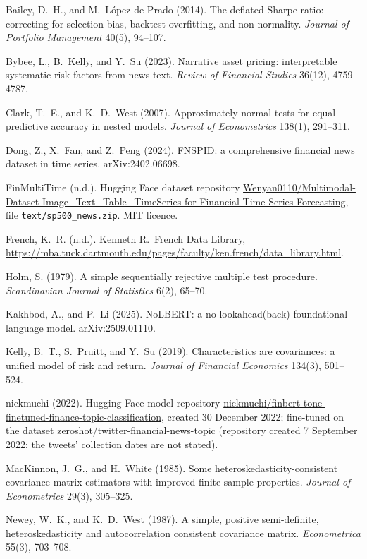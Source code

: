 \documentclass[11pt]{article}
\begin{document}
\begin{description}\setlength{\itemsep}{0pt}
\item Bailey, D.~H., and M.~L\'opez de Prado (2014). The deflated Sharpe ratio: correcting for selection bias, backtest overfitting, and non-normality. \emph{Journal of Portfolio Management} 40(5), 94--107.
\item Bybee, L., B.~Kelly, and Y.~Su (2023). Narrative asset pricing: interpretable systematic risk factors from news text. \emph{Review of Financial Studies} 36(12), 4759--4787.
\item Clark, T.~E., and K.~D.~West (2007). Approximately normal tests for equal predictive accuracy in nested models. \emph{Journal of Econometrics} 138(1), 291--311.
\item Dong, Z., X.~Fan, and Z.~Peng (2024). FNSPID: a comprehensive financial news dataset in time series. arXiv:2402.06698.
\item FinMultiTime (n.d.). Hugging Face dataset repository \url{Wenyan0110/Multimodal-Dataset-Image_Text_Table_TimeSeries-for-Financial-Time-Series-Forecasting}, file \texttt{text/sp500\_news.zip}. MIT licence.
\item French, K.~R. (n.d.). Kenneth R.~French Data Library, \url{https://mba.tuck.dartmouth.edu/pages/faculty/ken.french/data_library.html}.
\item Holm, S. (1979). A simple sequentially rejective multiple test procedure. \emph{Scandinavian Journal of Statistics} 6(2), 65--70.
\item Kakhbod, A., and P.~Li (2025). NoLBERT: a no lookahead(back) foundational language model. arXiv:2509.01110.
\item Kelly, B.~T., S.~Pruitt, and Y.~Su (2019). Characteristics are covariances: a unified model of risk and return. \emph{Journal of Financial Economics} 134(3), 501--524.
\item nickmuchi (2022). Hugging Face model repository \url{nickmuchi/finbert-tone-finetuned-finance-topic-classification}, created 30 December 2022; fine-tuned on the dataset \url{zeroshot/twitter-financial-news-topic} (repository created 7 September 2022; the tweets' collection dates are not stated).
\item MacKinnon, J.~G., and H.~White (1985). Some heteroskedasticity-consistent covariance matrix estimators with improved finite sample properties. \emph{Journal of Econometrics} 29(3), 305--325.
\item Newey, W.~K., and K.~D.~West (1987). A simple, positive semi-definite, heteroskedasticity and autocorrelation consistent covariance matrix. \emph{Econometrica} 55(3), 703--708.
\end{description}
\end{document}
